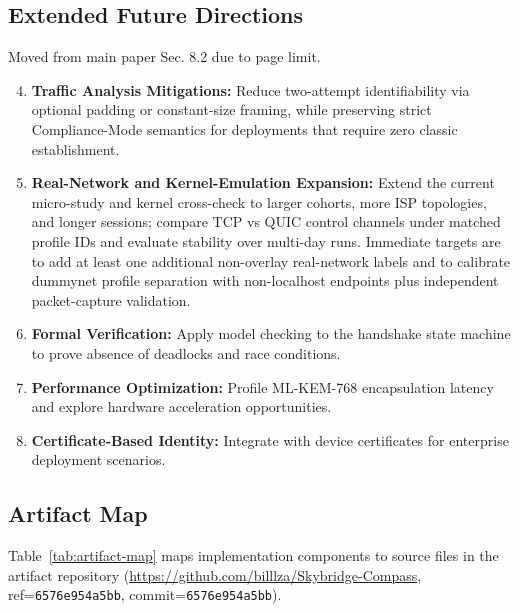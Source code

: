 \documentclass[10pt,journal,compsoc]{IEEEtran}
\newcommand{\artifacturl}{https://github.com/billlza/Skybridge-Compass}
\newcommand{\artifacturlshort}{https://github.com/billlza/Skybridge-Compass}
\newcommand{\artifacttag}{6576e954a5bb}
\newcommand{\artifactsha}{6576e954a5bb}
\begin{document}
\subsection*{Extended Future Directions}

Moved from main paper Sec. 8.2 due to page limit.

\begin{enumerate}
\setcounter{enumi}{3}
\item
  \textbf{Traffic Analysis Mitigations:} Reduce two-attempt
  identifiability via optional padding or constant-size framing, while
  preserving strict Compliance-Mode semantics for deployments that
  require zero classic establishment.
\item
  \textbf{Real-Network and Kernel-Emulation Expansion:} Extend the
  current micro-study and kernel cross-check to larger cohorts, more ISP
  topologies, and longer sessions; compare TCP vs QUIC control channels
  under matched profile IDs and evaluate stability over multi-day runs.
  Immediate targets are to add at least one additional non-overlay
  real-network labels and to calibrate dummynet profile separation with
  non-localhost endpoints plus independent packet-capture validation.
\item
  \textbf{Formal Verification:} Apply model checking to the handshake
  state machine to prove absence of deadlocks and race conditions.
\item
  \textbf{Performance Optimization:} Profile ML-KEM-768 encapsulation
  latency and explore hardware acceleration opportunities.
\item
  \textbf{Certificate-Based Identity:} Integrate with device
  certificates for enterprise deployment scenarios.
\end{enumerate}

\subsection*{Artifact Map}

Table~\ref{tab:artifact-map} maps implementation components to source
files in the artifact repository (\href{\artifacturl}{\artifacturlshort},
ref=\texttt{\artifacttag}, commit=\texttt{\artifactsha}).
\end{document}
